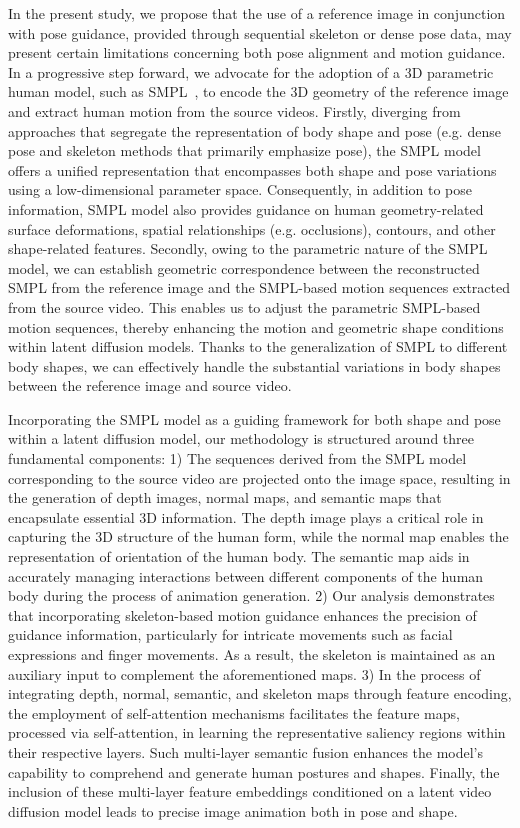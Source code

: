 In the present study, we propose that the use of a reference image in conjunction with pose guidance, provided through sequential skeleton or dense pose data, may present certain limitations concerning both pose alignment and motion guidance.
In a progressive step forward, we advocate for the adoption of a 3D parametric human model, such as SMPL~\cite{SMPL:2015}, to encode the 3D geometry of the reference image and extract human motion from the source videos.
Firstly, diverging from approaches that segregate the representation of body shape and pose (e.g. dense pose and skeleton methods that primarily emphasize pose), the SMPL model offers a unified representation that encompasses both shape and pose variations using a low-dimensional parameter space.
Consequently, in addition to pose information, SMPL model also provides guidance on human geometry-related surface deformations, spatial relationships (e.g. occlusions), contours, and other shape-related features.
Secondly, owing to the parametric nature of the SMPL model, we can establish geometric correspondence between the reconstructed SMPL from the reference image and the SMPL-based motion sequences extracted from the source video. 
This enables us to adjust the parametric SMPL-based motion sequences, thereby enhancing the motion and geometric shape conditions within latent diffusion models.
Thanks to the generalization of SMPL to different body shapes, we can effectively handle the substantial variations in body shapes between the reference image and source video.





Incorporating the SMPL model as a guiding framework for both shape and pose within a latent diffusion model, our methodology is structured around three fundamental components:
1) The sequences derived from the SMPL model corresponding to the source video are projected onto the image space, resulting in the generation of depth images, normal maps, and semantic maps that encapsulate essential 3D information. 
The depth image plays a critical role in capturing the 3D structure of the human form, while the normal map enables the representation of orientation of the human body. 
The semantic map aids in accurately managing interactions between different components of the human body during the process of animation generation.
2) Our analysis demonstrates that incorporating skeleton-based motion guidance enhances the precision of guidance information, particularly for intricate movements such as facial expressions and finger movements. 
As a result, the skeleton is maintained as an auxiliary input to complement the aforementioned maps.
3) In the process of integrating depth, normal, semantic, and skeleton maps through feature encoding, the employment of self-attention mechanisms facilitates the feature maps, processed via self-attention, in learning the representative saliency regions within their respective layers. 
Such multi-layer semantic fusion enhances the model's capability to comprehend and generate human postures and shapes. 
Finally, the inclusion of these multi-layer feature embeddings conditioned on a latent video diffusion model leads to precise image animation both in pose and shape.


